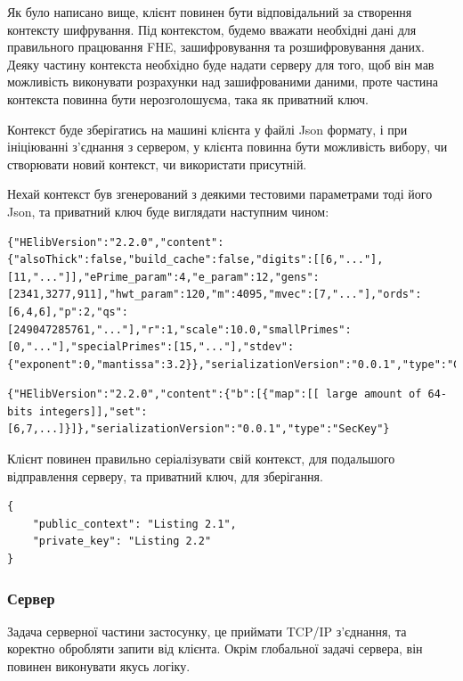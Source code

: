 Як було написано вище, клієнт повинен бути відповідальний за створення контексту шифрування. Під
контекстом, будемо вважати необхідні дані для правильного працювання FHE, зашифровування та розшифровування даних.
Деяку частину контекста необхідно буде надати серверу для того, щоб він мав можливість виконувати
розрахунки над зашифрованими даними, проте частина контекста повинна бути нерозголошуєма, така як
приватний ключ.

Контекст буде зберігатись на машині клієнта у файлі Json формату, і при ініціюванні з'єднання
з сервером, у клієнта повинна бути можливість вибору, чи створювати новий контекст, чи використати
присутній.

Нехай контекст був згенерований з деякими тестовими параметрами тоді його Json, та приватний
ключ буде виглядати наступним чином:

\begin{lstlisting}[breaklines, caption={Json репрезентація, контексу, деякі довгі послідовносиі чисел були замінені на трикрапку, щоб зменшити кількість тексту}, 
captionpos=b]
{"HElibVersion":"2.2.0","content":{"alsoThick":false,"build_cache":false,"digits":[[6,"..."],[11,"..."]],"ePrime_param":4,"e_param":12,"gens":[2341,3277,911],"hwt_param":120,"m":4095,"mvec":[7,"..."],"ords":[6,4,6],"p":2,"qs":[249047285761,"..."],"r":1,"scale":10.0,"smallPrimes":[0,"..."],"specialPrimes":[15,"..."],"stdev":{"exponent":0,"mantissa":3.2}},"serializationVersion":"0.0.1","type":"Context"}
\end{lstlisting}

\begin{lstlisting}[breaklines, caption={Json репрезентація приватного ключа}, captionpos=b]
{"HElibVersion":"2.2.0","content":{"b":[{"map":[[ large amount of 64-bits integers]],"set":[6,7,...]}]},"serializationVersion":"0.0.1","type":"SecKey"}
\end{lstlisting}
Клієнт повинен правильно серіалізувати свій контекст, для подальшого відправлення серверу,
та приватний ключ, для зберігання.

\begin{lstlisting}[breaklines, caption={Json формат зберігання приватного контексту на 
клієнті, для можливості його подальшого використання}, captionpos=b]
{
    "public_context": "Listing 2.1",
    "private_key": "Listing 2.2"
}
\end{lstlisting}

\subsubsection*{Сервер}
Задача серверної частини застосунку, це приймати TCP/IP з'єднання, та коректно обробляти 
запити від клієнта. Окрім глобальної задачі сервера, він повинен виконувати якусь логіку.

